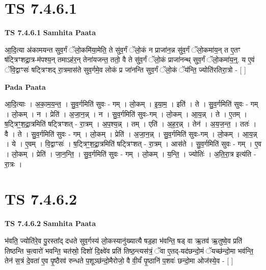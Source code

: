 \documentclass[17pt]{extarticle}
\begin{document}

\section{ TS 7.4.6.1 }

\textbf{TS 7.4.6.1 } \newline
\textbf{Samhita Paata} \newline

आ॒दि॒त्या अ॑कामयन्त सुव॒र्गं ॅलो॒कमि॑या॒मेति॒ ते सु॑व॒र्गं ॅलो॒कं न प्राजा॑न॒न्न सु॑व॒र्गं ॅलो॒कमा॑य॒न् त ए॒तꣳ ष॑ट्त्रिꣳशद्रा॒त्र-म॑पश्य॒न् तमाऽह॑र॒न् तेना॑यजन्त॒ ततो॒ वै ते सु॑व॒र्गं ॅलो॒कं प्राजा॑नन्थ् सुव॒र्गं ॅलो॒कमा॑य॒न्॒. य ए॒वं ॅवि॒द्वाꣳसः॑ षट्त्रिꣳशद् रा॒त्रमास॑ते सुव॒र्गमे॒व लोकं प्र जा॑नन्ति सुव॒र्गं ॅलो॒कं ॅय॑न्ति॒ ज्योति॑रतिरा॒त्रो - [  ] \newline

\textbf{Pada Paata} \newline

आ॒दि॒त्याः । अ॒का॒म॒य॒न्त॒ । सु॒व॒र्गमिति॑ सुवः - गम् । लो॒कम् । इ॒या॒म॒ । इति॑ । ते । सु॒व॒र्गमिति॑ सुवः - गम् । लो॒कम् । न । प्रेति॑ । अ॒जा॒न॒न्न् । न । सु॒व॒र्गमिति॑ सुवः-गम् । लो॒कम् । आ॒य॒न्न् । ते । ए॒तम् । ष॒ट्त्रिꣳ॒॒श॒द्रा॒त्रमिति॑ षट्त्रिꣳशत् - रा॒त्रम् । अ॒प॒श्य॒न्न् । तम् । एति॑ । अ॒ह॒र॒न्न् । तेन॑ । अ॒य॒ज॒न्त॒ । ततः॑ । वै । ते । सु॒व॒र्गमिति॑ सुवः - गम् । लो॒कम् । प्रेति॑ । अ॒जा॒न॒न्न् । सु॒व॒र्गमिति॑ सुवः-गम् । लो॒कम् । आ॒य॒न्न् । ये । ए॒वम् । वि॒द्वाꣳसः॑ । ष॒ट्त्रिꣳ॒॒श॒द्रा॒त्रमिति॑ षट्त्रिꣳशत् - रा॒त्रम् । आस॑ते । सु॒व॒र्गमिति॑ सुवः - गम् । ए॒व । लो॒कम् । प्रेति॑ । जा॒न॒न्ति॒ । सु॒व॒र्गमिति॑ सुवः - गम् । लो॒कम् । य॒न्ति॒ । ज्योतिः॑ । अ॒ति॒रा॒त्र इत्य॑ति - रा॒त्रः ।  \newline





\section{ TS 7.4.6.2 }

\textbf{TS 7.4.6.2 } \newline
\textbf{Samhita Paata} \newline

भ॑वति॒ ज्योति॑रे॒व पु॒रस्ता᳚द् दधते सुव॒र्गस्य॑ लो॒कस्यानु॑ख्यात्यै षड॒हा भ॑वन्ति॒ षड् वा ऋ॒तव॑ ऋ॒तुष्वे॒व प्रति॑ तिष्ठन्ति च॒त्वारो॑ भवन्ति॒ चत॑स्रो॒ दिशो॑ दि॒क्ष्वे॑व प्रति॑ तिष्ठ॒न्त्यस॑त्रं॒ ॅवा ए॒तद्-यद॑छन्दो॒मं ॅयच्छ॑न्दो॒मा भव॑न्ति॒ तेन॑ स॒त्रं दे॒वता॑ ए॒व पृ॒ष्ठैरव॑ रुन्धते प॒शूञ्छ॑न्दो॒मैरोजो॒ वै वी॒र्यं॑ पृ॒ष्ठानि॑ प॒शवः॑ छन्दो॒मा ओज॑स्ये॒व - [  ] \newline
\end{document}
